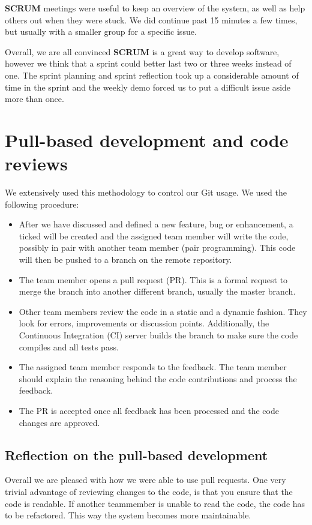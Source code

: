 \textbf{SCRUM} meetings were useful to keep an overview of the system, as well as help others out when they were stuck.
We did continue past 15 minutes a few times, but usually with a smaller group for a specific issue.

Overall, we are all convinced \textbf{SCRUM} is a great way to develop software, however we think that a sprint could better last two or three weeks instead of one.
The sprint planning and sprint reflection took up a considerable amount of time in the sprint and the weekly demo forced us to put a difficult issue aside more than once.

\section{Pull-based development and code reviews}
We extensively used this methodology to control our Git usage.
We used the following procedure:

\begin{itemize}
\item After we have discussed and defined a new feature, bug or enhancement, a ticked will be created and the assigned team member will write the code, possibly in pair with another team member (pair programming).
This code will then be pushed to a branch on the remote repository.

\item The team member opens a pull request (PR). 
This is a formal request to merge the branch into another different branch, usually the master branch.

\item Other team members review the code in a static and a dynamic fashion.
They look for errors, improvements or discussion points. 
Additionally, the Continuous Integration (CI) server builds the branch to make sure the code compiles and all tests pass.

\item The assigned team member responds to the feedback.
The team member should explain the reasoning behind the code contributions and process the feedback.

\item The PR is accepted once all feedback has been processed and the code changes are approved.
\end{itemize}

\subsection{Reflection on the pull-based development}
Overall we are pleased with how we were able to use pull requests.
One very trivial advantage of reviewing changes to the code, is that you ensure that the code is readable.
If another teammember is unable to read the code, the code has to be refactored.
This way the system becomes more maintainable.

